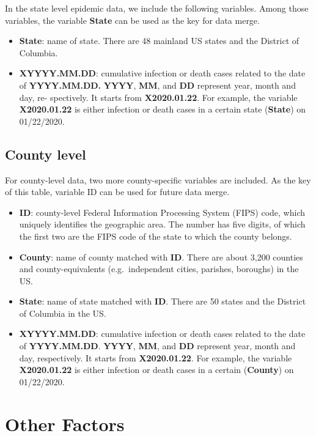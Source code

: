 \documentclass[]{book}
\begin{document}
In the state level epidemic data, we include the following variables.
Among those variables, the variable \textbf{State} can be used as the
key for data merge.

\begin{itemize}
\item
  \textbf{State}: name of state. There are 48 mainland US states and the
  District of Columbia.
\item
  \textbf{XYYYY.MM.DD}: cumulative infection or death cases related to
  the date of \textbf{YYYY.MM.DD.} \textbf{YYYY}, \textbf{MM}, and
  \textbf{DD} represent year, month and day, re- spectively. It starts
  from \textbf{X2020.01.22}. For example, the variable
  \textbf{X2020.01.22} is either infection or death cases in a certain
  state (\textbf{State}) on 01/22/2020.
\end{itemize}

\subsection{County level}\label{county-level}

For county-level data, two more county-specific variables are included.
As the key of this table, variable ID can be used for future data merge.

\begin{itemize}
\item
  \textbf{ID}: county-level Federal Information Processing System (FIPS)
  code, which uniquely identifies the geographic area. The number has
  five digits, of which the first two are the FIPS code of the state to
  which the county belongs.
\item
  \textbf{County}: name of county matched with \textbf{ID}. There are
  about 3,200 counties and county-equivalents (e.g.~independent cities,
  parishes, boroughs) in the US.
\item
  \textbf{State}: name of state matched with \textbf{ID}. There are 50
  states and the District of Columbia in the US.
\item
  \textbf{XYYYY.MM.DD}: cumulative infection or death cases related to
  the date of \textbf{YYYY.MM.DD}. \textbf{YYYY}, \textbf{MM}, and
  \textbf{DD} represent year, month and day, respectively. It starts
  from \textbf{X2020.01.22}. For example, the variable
  \textbf{X2020.01.22} is either infection or death cases in a certain
  (\textbf{County}) on 01/22/2020.
\end{itemize}

\section{Other Factors}\label{other-factors}
\end{document}
